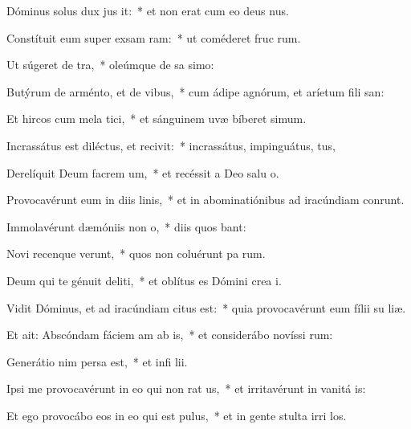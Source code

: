 \item Dóminus solus dux jus it:~* et non erat cum eo deus nus.
\item Constítuit eum super exsam ram:~* ut coméderet fruc rum.
\item Ut súgeret  de tra,~* oleúmque de sa simo:
\item Butýrum de arménto, et  de vibus,~* cum ádipe agnórum, et aríetum fili san:
\item Et hircos cum mela tici,~* et sánguinem uvæ bíberet simum.
\item Incrassátus est diléctus, et recivit:~* incrassátus, impinguátus, tus,
\item Derelíquit Deum facrem um,~* et recéssit a Deo salu o.
\item Provocavérunt eum in diis linis,~* et in abominatiónibus ad iracúndiam conrunt.
\item Immolavérunt dæmóniis  non o,~* diis quos bant:
\item Novi recenque verunt,~* quos non coluérunt pa rum.
\item Deum qui te génuit deliti,~* et oblítus es Dómini crea i.
\item \singlecolsep
\item Vidit Dóminus, et ad iracúndiam citus est:~* quia provocavérunt eum fílii su  liæ.
\item Et ait: Abscóndam fáciem am ab is,~* et considerábo novíssi rum:
\item Generátio nim persa est,~* et infi lii.
\item Ipsi me provocavérunt in eo qui non rat us,~* et irritavérunt in vanitá is:
\item Et ego provocábo eos in eo qui  est pulus,~* et in gente stulta irri los.
